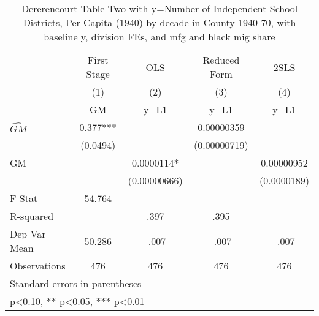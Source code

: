 \begin{table}[htbp]\centering
\def\sym#1{\ifmmode^{#1}\else\(^{#1}\)\fi}
\caption{Dererencourt Table Two with y=Number of Independent School Districts, Per Capita (1940) by decade in County 1940-70, with baseline y, division FEs, and mfg and black mig share}
\begin{tabular}{l*{4}{c}}
\toprule
                    & First Stage   &         OLS   &Reduced Form   &        2SLS   \\
                    &\multicolumn{1}{c}{(1)}&\multicolumn{1}{c}{(2)}&\multicolumn{1}{c}{(3)}&\multicolumn{1}{c}{(4)}\\
                    &\multicolumn{1}{c}{GM}&\multicolumn{1}{c}{y\_L1}&\multicolumn{1}{c}{y\_L1}&\multicolumn{1}{c}{y\_L1}\\
\midrule
$\hat{GM}$          &       0.377***&               &  0.00000359   &               \\
                    &    (0.0494)   &               &(0.00000719)   &               \\
\addlinespace
GM                  &               &   0.0000114*  &               &  0.00000952   \\
                    &               &(0.00000666)   &               & (0.0000189)   \\
\midrule
F-Stat              &      54.764   &               &               &               \\
R-squared           &               &        .397   &        .395   &               \\
Dep Var Mean        &      50.286   &       -.007   &       -.007   &       -.007   \\
Observations        &         476   &         476   &         476   &         476   \\
\bottomrule
\multicolumn{5}{l}{\footnotesize Standard errors in parentheses}\\
\multicolumn{5}{l}{\footnotesize * p<0.10, ** p<0.05, *** p<0.01}\\
\end{tabular}
\end{table}
